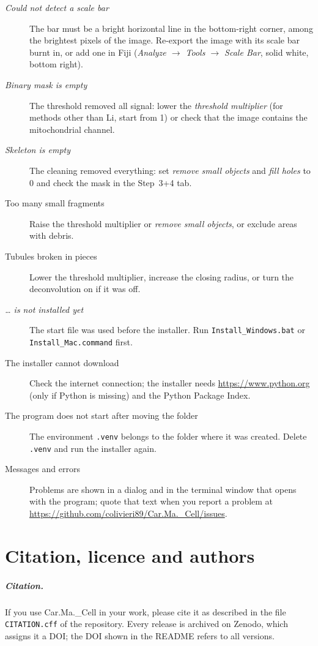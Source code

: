 \documentclass[fontsize=10.5pt,paper=a4,parskip=half,headings=normal,numbers=noenddot,
  open=any,captions=tableheading]{scrreprt}
\newcommand{\prog}{Car.Ma.\_Cell}
\newcommand{\file}[1]{\texttt{#1}}
\begin{document}
\begin{description}
\item[\emph{Could not detect a scale bar}] The bar must be a bright horizontal line in the bottom-right corner, among the brightest pixels of the image. Re-export the image with its scale bar burnt in, or add one in Fiji (\emph{Analyze $\rightarrow$ Tools $\rightarrow$ Scale Bar}, solid white, bottom right).
\item[\emph{Binary mask is empty}] The threshold removed all signal: lower the \emph{threshold multiplier} (for methods other than Li, start from 1) or check that the image contains the mitochondrial channel.
\item[\emph{Skeleton is empty}] The cleaning removed everything: set \emph{remove small objects} and \emph{fill holes} to 0 and check the mask in the Step~3+4 tab.
\item[Too many small fragments] Raise the threshold multiplier or \emph{remove small objects}, or exclude areas with debris.
\item[Tubules broken in pieces] Lower the threshold multiplier, increase the closing radius, or turn the deconvolution on if it was off.
\item[\emph{… is not installed yet}] The start file was used before the installer. Run \file{Install\_Windows.bat} or \file{Install\_Mac.command} first.
\item[The installer cannot download] Check the internet connection; the installer needs \url{https://www.python.org} (only if Python is missing) and the Python Package Index.
\item[The program does not start after moving the folder] The environment \file{.venv} belongs to the folder where it was created. Delete \file{.venv} and run the installer again.
\item[Messages and errors] Problems are shown in a dialog and in the terminal window that opens with the program; quote that text when you report a problem at \url{https://github.com/colivieri89/Car.Ma._Cell/issues}.
\end{description}

\chapter{Citation, licence and authors}

\paragraph{Citation.} If you use \prog{} in your work, please cite it as described in the file \file{CITATION.cff} of the repository. Every release is archived on Zenodo, which assigns it a DOI; the DOI shown in the README refers to all versions.
\end{document}
